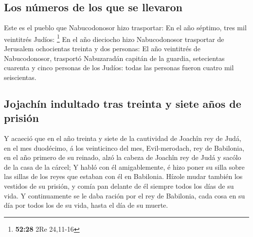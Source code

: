 \hypertarget{los-nuxfameros-de-los-que-se-llevaron}{%
\subsection{Los números de los que se
llevaron}\label{los-nuxfameros-de-los-que-se-llevaron}}

 Este es el pueblo que Nabucodonosor hizo trasportar: En el
año séptimo, tres mil veintitrés Judíos: \footnote{\textbf{52:28} 2Re
  24,11-16}  En el año dieciocho hizo Nabucodonosor
trasportar de Jerusalem ochocientas treinta y dos personas:
 El año veintitrés de Nabucodonosor, trasportó Nabuzaradán
capitán de la guardia, setecientas cuarenta y cinco personas de los
Judíos: todas las personas fueron cuatro mil seiscientas.

\hypertarget{jojachuxedn-indultado-tras-treinta-y-siete-auxf1os-de-prisiuxf3n}{%
\subsection{Jojachín indultado tras treinta y siete años de
prisión}\label{jojachuxedn-indultado-tras-treinta-y-siete-auxf1os-de-prisiuxf3n}}

 Y acaeció que en el año treinta y siete de la cautividad
de Joachîn rey de Judá, en el mes duodécimo, á los veinticinco del mes,
Evil-merodach, rey de Babilonia, en el año primero de su reinado, alzó
la cabeza de Joachîn rey de Judá y sacólo de la casa de la cárcel;
 Y habló con él amigablemente, é hizo poner su silla sobre
las sillas de los reyes que estaban con él en Babilonia. 
Hízole mudar también los vestidos de su prisión, y comía pan delante de
él siempre todos los días de su vida.  Y continuamente se
le daba ración por el rey de Babilonia, cada cosa en su día por todos
los de su vida, hasta el día de su muerte.
